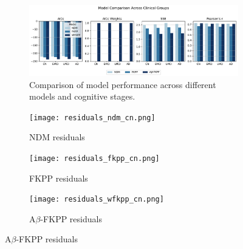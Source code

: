 

\begin{figure}[tbp]
    \begin{tcolorbox}
        \centering
        \begin{subfigure}{\linewidth}
            \centering
            \includegraphics[width=\linewidth]{figures/model_comparison.pdf}
            \caption{Comparison of model performance across different models and cognitive stages.}
            \label{fig:model_comparison_main}
        \end{subfigure}
        
        \vspace{2em} %
        
        \begin{subfigure}{0.32\linewidth}
            \centering
            \texttt{[image: residuals\_ndm\_cn.png]}
            \caption{NDM residuals}
            \label{fig:ndm_residuals}
        \end{subfigure}
        \hfill
        \begin{subfigure}{0.32\linewidth}
            \centering
            \texttt{[image: residuals\_fkpp\_cn.png]}
            \caption{FKPP residuals}
            \label{fig:fkpp_residuals}
        \end{subfigure}
        \hfill
        \begin{subfigure}{0.32\linewidth}
            \centering
            \texttt{[image: residuals\_wfkpp\_cn.png]}
            \caption{A$\beta$-FKPP residuals}
            \label{fig:wfkpp_residuals}
        \end{subfigure}
        

\end{tcolorbox}
\end{figure}

